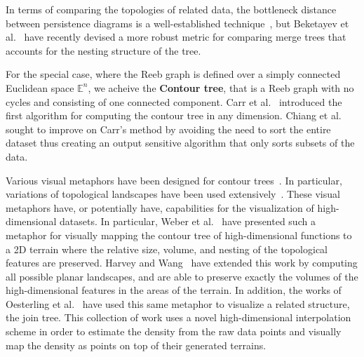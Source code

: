 In terms of comparing the topologies of related data, the bottleneck distance between persistence diagrams is a well-established technique~\cite{Cohen-SteinerEdelsbrunnerHarer2007}, but Beketayev et al.~\cite{BeketayevYeliussizovMorozov2014} have recently devised a more robust metric for comparing merge trees that accounts for the nesting structure of the tree.


For the special case, where the Reeb graph is defined over a simply connected Euclidean space $\mathbb{E}^n$, we acheive the \textbf{Contour tree}, that is a Reeb graph with no cycles and consisting of one connected component.
%
Carr et al.~\cite{CarrSnoeyinkAxen2003} introduced the first algorithm for computing the contour tree in any dimension.
%
Chiang et al.~\cite{ChiangLenzLu2005} sought to improve on Carr's method by avoiding the need to sort the entire dataset thus creating an output sensitive algorithm that only sorts subsets of the data.
%

Various visual metaphors have been designed for contour trees~\cite{PascucciCole-McLaughlinScorzelli2009,WeberBremerPascucci2012}.
%
In particular, variations of topological landscapes have been used extensively~\cite{BeketayevMorozovWeber2012,DemirBeketayevWeber2012,HarveyWang2010,OesterlingHeineJanicke2010,OesterlingHeineJanicke2011,WeberBremerPascucci2007}.
%
These visual metaphors have, or potentially have, capabilities for the visualization of high-dimensional datasets.
%
In particular, Weber et al.~\cite{WeberBremerPascucci2007} have presented such a metaphor for visually mapping the contour tree of high-dimensional functions to a 2D terrain where the relative size, volume, and nesting of the topological features are preserved.
%
Harvey and Wang~\cite{HarveyWang2010} have extended this work by computing all possible planar landscapes, and are able to preserve exactly the volumes of the high-dimensional features in the areas of the terrain.
%
In addition, the works of Oesterling et al.~\cite{OesterlingHeineJanicke2010,OesterlingHeineJanicke2011} have used this same metaphor to visualize a related structure, the join tree.
%
This collection of work uses a novel high-dimensional interpolation scheme in order to estimate the density from the raw data points and visually map the density as points on top of their generated terrains.

